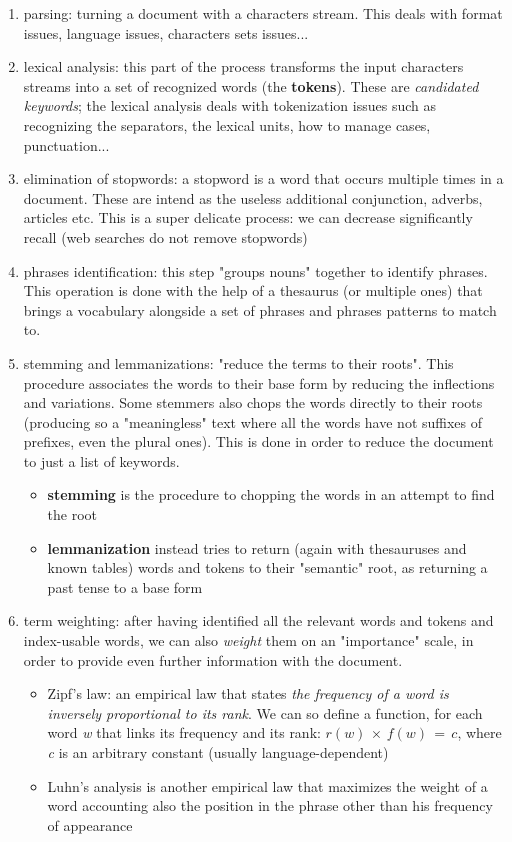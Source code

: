 \documentclass{article}
\begin{document}
				\begin{enumerate}
					\item parsing: turning a document with a characters stream. This deals with format issues, language issues, characters sets issues...
					\item lexical analysis: this part of the process transforms the input characters streams into a set of recognized words (the \textbf{tokens}). These are \textit{candidated keywords}; the lexical analysis deals with tokenization issues such as recognizing the separators, the lexical units, how to manage cases, punctuation...
					\item elimination of stopwords: a stopword is a word that occurs multiple times in a document. These are intend as the useless additional conjunction, adverbs, articles etc. This is a super delicate process: we can decrease significantly recall (web searches do not remove stopwords)
					\item phrases identification: this step "groups nouns" together to identify phrases. This operation is done with the help of a thesaurus (or multiple ones) that brings a vocabulary alongside a set of phrases and phrases patterns to match to.
					\item stemming and lemmanizations: "reduce the terms to their roots". This procedure associates the words to their base form by reducing the inflections and variations. Some stemmers also chops the words directly to their roots (producing so a "meaningless" text where all the words have not suffixes of prefixes, even the plural ones). This is done in order to reduce the document to just a list of keywords.
						\begin{itemize}
							\item \textbf{stemming} is the procedure to chopping the words in an attempt to find the root
							\item \textbf{lemmanization} instead tries to return (again with thesauruses and known tables) words and tokens to their "semantic" root, as returning a past tense to a base form
						\end{itemize}
					\item term weighting: after having identified all the relevant words and tokens and index-usable words, we can also \textit{weight} them on an "importance" scale, in order to provide even further information with the document.
						\begin{itemize}
							\item Zipf's law: an empirical law that states \textit{the frequency of a word is inversely proportional to its rank}. We can so define a function, for each word \emph{w} that links its frequency and its rank: $r(w)\, \times\, f(w)\, =\, c$, where \emph{c} is an arbitrary constant (usually language-dependent)
							\item Luhn's analysis is another empirical law that maximizes the weight of a word accounting also the position in the phrase other than his frequency of appearance
						\end{itemize}
				\end{enumerate}
\end{document}
